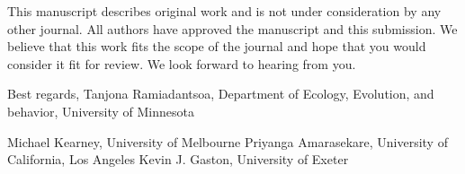 
This manuscript describes original work and is not under consideration by any other journal.
All authors have approved the manuscript and this submission.
We believe that this work fits the scope of the journal and hope that you would consider it fit for review.
We look forward to hearing from you.

Best regards,
Tanjona Ramiadantsoa,
Department of Ecology, Evolution, and behavior, University of Minnesota

Michael Kearney, University of Melbourne
Priyanga Amarasekare, University of California, Los Angeles
Kevin J. Gaston, University of Exeter
